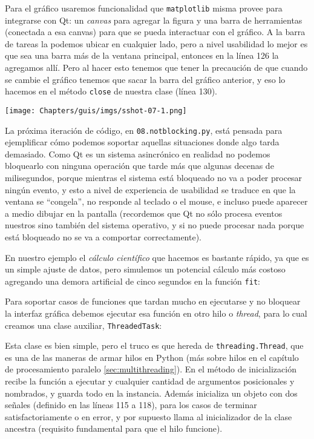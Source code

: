 Para el gráfico usaremos funcionalidad que \texttt{matplotlib} misma provee para integrarse con Qt: un \textit{canvas} para agregar la figura y una barra de herramientas (conectada a esa canvas) para que se pueda interactuar con el gráfico. A la barra de tareas la podemos ubicar en cualquier lado, pero a nivel usabilidad lo mejor es que sea una barra más de la ventana principal, entonces en la línea 126 la agregamos allí. Pero al hacer esto tenemos que tener la precaución de que cuando se cambie el gráfico tenemos que sacar la barra del gráfico anterior, y eso lo hacemos en el método \texttt{close} de nuestra clase (línea 130).

\begin{center}
    \texttt{[image: Chapters/guis/imgs/sshot-07-1.png]}
\end{center}

La próxima iteración de código, en \texttt{08.notblocking.py}, está pensada para ejemplificar cómo podemos soportar aquellas situaciones donde algo tarda demasiado. Como Qt es un sistema asincrónico en realidad no podemos bloquearlo con ninguna operación que tarde más que algunas decenas de milisegundos, porque mientras el sistema está bloqueado no va a poder procesar ningún evento, y esto a nivel de experiencia de usabilidad se traduce en que la ventana se ``congela'', no responde al teclado o el mouse, e incluso puede aparecer a medio dibujar en la pantalla (recordemos que Qt no sólo procesa eventos nuestros sino también del sistema operativo, y si no puede procesar nada porque está bloqueado no se va a comportar correctamente).

En nuestro ejemplo el \textit{cálculo científico} que hacemos es bastante rápido, ya que es un simple ajuste de datos, pero simulemos un potencial cálculo más costoso agregando una demora artificial de cinco segundos en la función \texttt{fit}:


Para soportar casos de funciones que tardan mucho en ejecutarse y no bloquear la interfaz gráfica debemos ejecutar esa función en otro hilo o \textit{thread}, para lo cual creamos una clase auxiliar, \texttt{ThreadedTask}:


Esta clase es bien simple, pero el truco es que hereda de \texttt{threading.Thread}, que es una de las maneras de armar hilos en Python (más sobre hilos en el capítulo de procesamiento paralelo \ref{sec:multithreading}). En el método de inicialización recibe la función a ejecutar y cualquier cantidad de argumentos posicionales y nombrados, y guarda todo en la instancia. Además inicializa un objeto con dos señales (definido en las líneas 115 a 118), para los casos de terminar satisfactoriamente o en error, y por supuesto llama al inicializador de la clase ancestra (requisito fundamental para que el hilo funcione).

